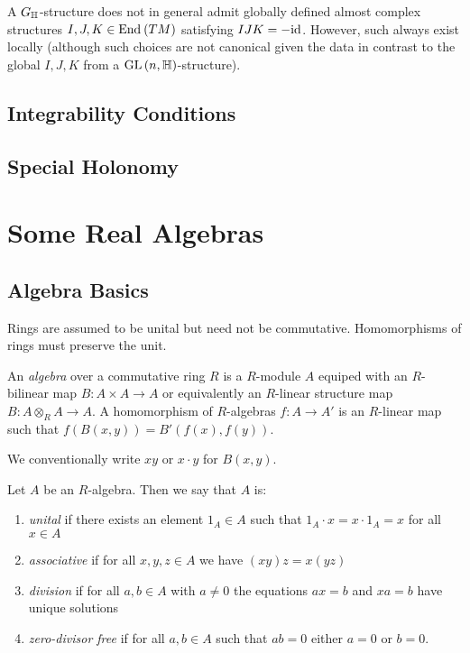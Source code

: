 \documentclass[12pt]{extarticle}
\begin{document}
\begin{rmk}
A $G_{\mathbb{H}}$-structure does not in general admit globally defined almost complex structures $I, J, K \in \mathrm{End}_{}\left(TM\right)$ satisfying $IJK = - \mathrm{id}$. However, such always exist locally (although such choices are not canonical given the data in contrast to the global $I,J,K$ from a $\mathrm{GL}\left(n, \mathbb{H} \right)$-structure).
\end{rmk}

\subsection{Integrability Conditions}

\subsection{Special Holonomy}

\section{Some Real Algebras}

\subsection{Algebra Basics}

\begin{rmk}
Rings are assumed to be unital but need not be commutative. Homomorphisms of rings must preserve the unit.
\end{rmk}

\begin{defn}
An \textit{algebra} over a commutative ring $R$ is a $R$-module $A$ equiped with an $R$-bilinear map $B : A \times A \to A$ or equivalently an $R$-linear structure map $B : A \otimes_R A \to A$. A homomorphism of $R$-algebras $f : A \to A'$ is an $R$-linear map such that $f(B(x,y)) = B'(f(x), f(y))$.
\end{defn}

\begin{rmk}
We conventionally write $xy$ or $x \cdot y$ for $B(x,y)$.
\end{rmk}


\begin{defn}
Let $A$ be an $R$-algebra. Then we say that $A$ is:
\begin{enumerate}
\item \textit{unital} if there exists an element $1_A \in A$ such that $1_A \cdot x = x \cdot 1_A = x$ for all $x \in A$
\item \textit{associative} if for all $x,y,z \in A$ we have $(xy)z = x(yz)$
\item \textit{division} if for all $a, b \in A$ with $a \neq 0$ the equations $ax = b$ and $xa = b$ have unique solutions
\item \textit{zero-divisor free} if for all $a, b \in A$ such that $ab = 0$ either $a = 0$ or $b = 0$.
\end{enumerate}
\end{defn}
\end{document}
